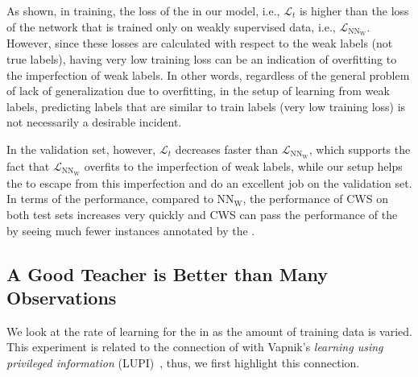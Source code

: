 As shown, in training, the loss of the \tnet in our model, i.e., $\mathcal{L}_t$ is higher than the loss of the network that is trained only on weakly supervised data, i.e., $\mathcal{L}_{\text{NN}_{\text{W}}}$. 
%
However, since these losses are calculated with respect to the weak labels (not true labels), having very low training loss can be an indication of overfitting to the imperfection of weak labels. 
%
In other words, regardless of the general problem of lack of generalization due to overfitting, in the setup of learning from weak labels, predicting labels that are similar to train labels (very low training loss) is not necessarily a desirable incident. 

In the validation set, however, $\mathcal{L}_t$ decreases faster than $\mathcal{L}_{\text{NN}_{\text{W}}}$, which supports the fact that $\mathcal{L}_{\text{NN}_{\text{W}}}$ overfits to the imperfection of weak labels, while our setup helps the \tnet to escape from this imperfection and do an excellent job on the validation set.
%
In terms of the performance, compared to $\text{NN}_{\text{W}}$, the performance of CWS on both test sets increases very quickly and CWS can pass the performance of the \wa by seeing much fewer instances annotated by the \wa.
\subsection{A Good Teacher is Better than Many Observations} 

We look at the rate of learning for the \std in \fwl as the amount of training data is varied. This experiment is related to the connection of \fwl with Vapnik's \emph{learning using privileged information} (LUPI)~\citep{vapnik2009new, vapnik2015learning}, thus,  we first  highlight this connection.

